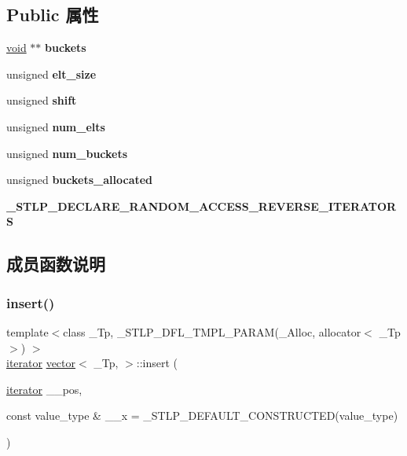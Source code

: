 \subsection*{Public 属性}
\begin{DoxyCompactItemize}
\item 
\mbox{\label{structvector_a6bfb8ecadcbc53cf71bb41cc3f262178}} 
\hyperlink{interfacevoid}{void} $\ast$$\ast$ {\bfseries buckets}
\item 
\mbox{\label{structvector_a4afccc2a85cc5319d078384af658d194}} 
unsigned {\bfseries elt\+\_\+size}
\item 
\mbox{\label{structvector_aa1faac97ffa0bf6567e9a6d26528c82f}} 
unsigned {\bfseries shift}
\item 
\mbox{\label{structvector_a2c33857232fcdcf57a47180619cd621b}} 
unsigned {\bfseries num\+\_\+elts}
\item 
\mbox{\label{structvector_ae37ef431942709c4cf7a5006e2312a73}} 
unsigned {\bfseries num\+\_\+buckets}
\item 
\mbox{\label{structvector_a564d33111242df40605406d4aeb496b1}} 
unsigned {\bfseries buckets\+\_\+allocated}
\item 
\mbox{\label{structvector_aeba2ff27d4d1e9a3cc8032787ff695fe}} 
{\bfseries \+\_\+\+S\+T\+L\+P\+\_\+\+D\+E\+C\+L\+A\+R\+E\+\_\+\+R\+A\+N\+D\+O\+M\+\_\+\+A\+C\+C\+E\+S\+S\+\_\+\+R\+E\+V\+E\+R\+S\+E\+\_\+\+I\+T\+E\+R\+A\+T\+O\+RS}
\end{DoxyCompactItemize}


\subsection{成员函数说明}
\mbox{\label{structvector_a8835d813f0a67b599e79b3fc592f6e3f}} 
\subsubsection{\texorpdfstring{insert()}{insert()}}
{\footnotesize\ttfamily template$<$class \+\_\+\+Tp, \+\_\+\+S\+T\+L\+P\+\_\+\+D\+F\+L\+\_\+\+T\+M\+P\+L\+\_\+\+P\+A\+R\+A\+M(\+\_\+\+Alloc, allocator$<$ \+\_\+\+Tp $>$) $>$ \\
\hyperlink{structiterator}{iterator} \hyperlink{structvector}{vector}$<$ \+\_\+\+Tp, $>$\+::insert (\begin{DoxyParamCaption}\item[{\hyperlink{structiterator}{iterator}}]{\+\_\+\+\_\+pos,  }\item[{const value\+\_\+type \&}]{\+\_\+\+\_\+x = {\ttfamily \+\_\+STLP\+\_\+DEFAULT\+\_\+CONSTRUCTED(value\+\_\+type)} }\end{DoxyParamCaption})\hspace{0.3cm}{\ttfamily [inline]}}

